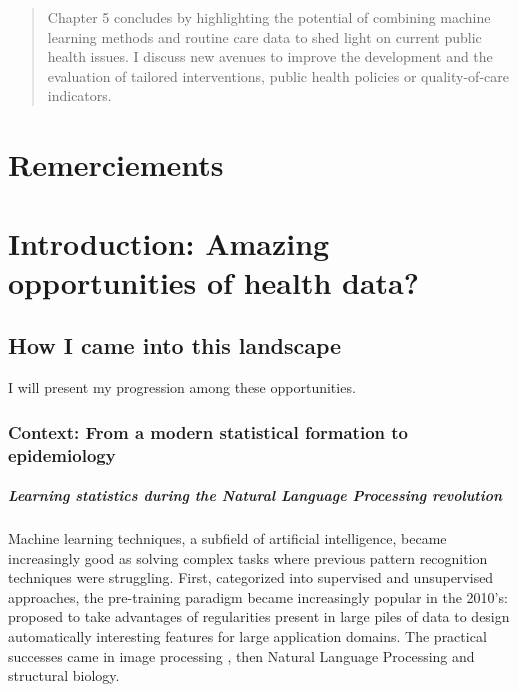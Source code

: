 \documentclass{report}
\begin{document}
\begin{abstract}
  Chapter 5 concludes by highlighting the potential of combining machine
  learning methods and routine care data to shed light on current public health
  issues. I discuss new avenues to improve the development and the evaluation of
  tailored interventions, public health policies or quality-of-care indicators.

\end{abstract}

\tableofcontents


\chapter*{Remerciements}


\chapter{Introduction: Amazing opportunities of health data?}\label{chap:intro}
\section{How I came into this landscape}\label{sec:intro:landscape}

I will present my progression among these opportunities.

\subsection{Context: From a modern statistical formation to epidemiology}\label{subsec:intro:context}

\paragraph{Learning statistics during the Natural Language Processing revolution}

Machine learning techniques, a subfield of artificial intelligence, became
increasingly good as solving complex tasks where previous pattern recognition
techniques were struggling. First, categorized into supervised and unsupervised
approaches, the pre-training paradigm became increasingly popular in the 2010's:
\cite{halevy2009unreasonable} proposed to take advantages of regularities
present in large piles of data to design automatically interesting features for
large application domains. The practical successes came in image processing
\citep{}, then Natural Language Processing \citep{} and structural biology.
%
\end{document}
